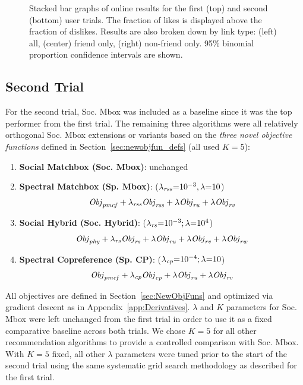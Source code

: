 \begin{figure}[t!]
\vspace{-2mm}
\caption{Stacked bar graphs of online results for the first (top)
and second (bottom) user trials.  The fraction of likes is displayed
above the fraction of dislikes.  Results are also broken down by link
type: (left) all, (center) friend only, (right) non-friend only.  95\%
binomial proportion confidence intervals are shown.}
\label{fig:trial_results}
\end{figure}


\subsection{Second Trial} 

For the second trial, Soc. Mbox 
was included as a baseline since it was the top performer
from the first trial.  The remaining three algorithms
were all relatively orthogonal Soc. Mbox extensions or variants 
based on the \emph{three novel objective functions} defined in 
Section~\ref{sec:newobjfun_defs} (all used $K=5$):
\denselist
\begin{enumerate}
\item {\bf Social Matchbox (Soc. Mbox)}: unchanged
\item {\bf Spectral Matchbox \sq (Sp. \sq Mbox)}: \sq ($\lambda_{\mathit{rss}}\hspace{-.9mm}=\hspace{-.9mm} 10^{-3}, \lambda\hspace{-.9mm}=\hspace{-.9mm} 10$)
$$\mathit{Obj}_{\mathit{pmcf}} + \lambda_{\mathit{rss}} \mathit{Obj}_{\mathit{rss}} + \lambda \mathit{Obj}_{\mathit{ru}} + \lambda \mathit{Obj}_{\mathit{rv}}$$
\item {\bf Social Hybrid (Soc. Hybrid)}: ($\lambda_{\mathit{rs}} \hspace{-.9mm} = \hspace{-.9mm} 10^{-3}; \lambda \hspace{-.9mm} = \hspace{-.9mm} 10^4$) 
$$\mathit{Obj}_{\mathit{phy}} + \lambda_{\mathit{rs}} \mathit{Obj}_{\mathit{rs}} + \lambda \mathit{Obj}_{\mathit{ru}} + \lambda \mathit{Obj}_{\mathit{rv}} + \lambda \mathit{Obj}_{\mathit{rw}}$$
\item {\bf Spectral \sqt Copreference \sq (Sp. \sq CP)}: \sql ($\lambda_{\mathit{cp}} \hspace{-.9mm} = \hspace{-.9mm} 10^{-4}; \lambda \hspace{-.9mm} = \hspace{-.9mm} 10$)
$$\mathit{Obj}_{\mathit{pmcf}} + \lambda_{\mathit{cp}} \mathit{Obj}_{\mathit{cp}} + \lambda \mathit{Obj}_{\mathit{ru}} + \lambda \mathit{Obj}_{\mathit{rv}}$$
\end{enumerate}
All objectives are defined in Section~\ref{sec:NewObjFuns} and
optimized via gradient descent as in Appendix~\ref{app:Derivatives}.
$\lambda$ and $K$ parameters for Soc. Mbox were left unchanged from
the first trial in order to use it as a fixed comparative baseline across
both trials.  We chose
$K=5$ for all other recommendation algorithms to provide a controlled
comparison with Soc. Mbox.  With $K=5$ fixed, all other
$\lambda$ parameters were tuned prior to the start of the second trial
using the same systematic grid search methodology as described for the 
first trial.

